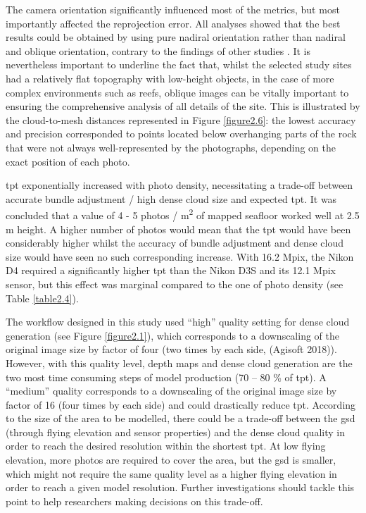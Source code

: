 The camera orientation significantly influenced most of the metrics, but most importantly affected the reprojection error. All analyses showed that the best results could be obtained by using pure nadiral orientation rather than nadiral and oblique orientation, contrary to the findings of other studies \citep{chiabrando_influence_2017}. It is nevertheless important to underline the fact that, whilst the selected study sites had a relatively flat topography with low-height objects, in the case of more complex environments such as reefs, oblique images can be vitally important to ensuring the comprehensive analysis of all details of the site. This is illustrated by the cloud-to-mesh distances represented in Figure \ref{figure2.6}: the lowest accuracy and precision corresponded to points located below overhanging parts of the rock that were not always well-represented by the photographs, depending on the exact position of each photo.

\acrshort{tpt} exponentially increased with photo density, necessitating a trade-off between accurate bundle adjustment / high dense cloud size and expected \acrshort{tpt}. It was concluded that a value of 4 - 5 photos / m\textsuperscript{2} of mapped seafloor worked well at 2.5 m height. A higher number of photos would mean that the \acrshort{tpt} would have been considerably higher whilst the accuracy of bundle adjustment and dense cloud size would have seen no such corresponding increase. With 16.2 Mpix, the Nikon D4 required a significantly higher \acrshort{tpt} than the Nikon D3S and its 12.1 Mpix sensor, but this effect was marginal compared to the one of photo density (see Table \ref{table2.4}).

The workflow designed in this study used “high” quality setting for dense cloud generation (see Figure \ref{figure2.1}), which corresponds to a downscaling of the original image size by factor of four (two times by each side, (Agisoft 2018)). However, with this quality level, depth maps and dense cloud generation are the two most time consuming steps of model production (70 – 80 \% of \acrshort{tpt}). A “medium” quality corresponds to a downscaling of the original image size by factor of 16 (four times by each side) and could drastically reduce \acrshort{tpt}. According to the size of the area to be modelled, there could be a trade-off between the \acrshort{gsd} (through flying elevation and sensor properties) and the dense cloud quality in order to reach the desired resolution within the shortest \acrshort{tpt}. At low flying elevation, more photos are required to cover the area, but the \acrshort{gsd} is smaller, which might not require the same quality level as a higher flying elevation in order to reach a given model resolution. Further investigations should tackle this point to help researchers making decisions on this trade-off.

